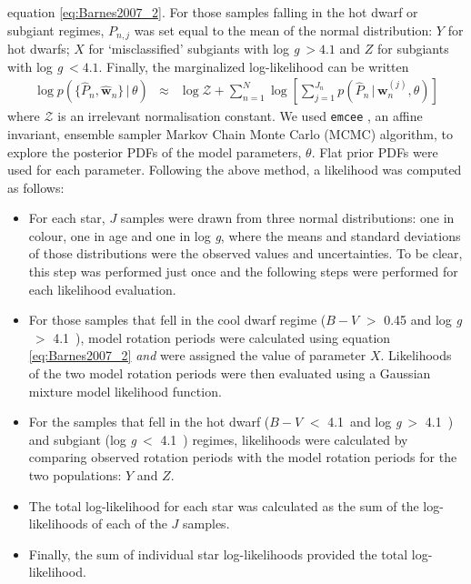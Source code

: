 \documentclass[11pt,preprint]{aastex}
\newcommand{\logg}{log \emph{g}}
\newcommand{\w}{\mathbf{w}}
\newcommand{\subcut}{4.1~}
\begin{document}
equation \ref{eq:Barnes2007_2}.
For those samples falling in the hot dwarf or subgiant regimes, $P_{n,j}$ was
set equal to the mean of the normal distribution: $Y$ for hot dwarfs; $X$ for
`misclassified' subgiants with \logg$~>4.1$ and $Z$ for subgiants with
\logg$~<4.1$.
Finally, the marginalized log-likelihood can be written
\begin{eqnarray}
	\log p(\{\hat{P}_n,\hat{\w}_n\}\,|\,\theta) &\approx&
	\log \mathcal{Z} + \sum_{n=1}^N
	\log \left[ \sum_{j=1}^{J_n}p(\hat{P}_n\,|\,\mathbf{w}_n^{(j)}, \theta) \right ]
\end{eqnarray}
where $\mathcal{Z}$ is an irrelevant normalisation constant.
We used {\tt emcee} \citep{Foreman-Mackey2013}, an affine invariant, ensemble
sampler Markov Chain Monte Carlo (MCMC) algorithm, to explore the posterior
PDFs of the model parameters, $\theta$.
Flat prior PDFs were used for each parameter.
Following the above method, a likelihood was computed as follows:
\begin{itemize}
	\item For each star, $J$ samples were drawn from three normal
		distributions: one in colour, one in age and one in \logg,
		where the means and standard deviations of those distributions
		were the observed values and uncertainties.
		To be clear, this step was performed just once and the
		following steps were performed for each likelihood evaluation.
	\item For those samples that fell in the cool dwarf regime
		($B-V$ $>$ 0.45 and \logg$~>$ \subcut), model rotation
		periods were calculated using equation \ref{eq:Barnes2007_2}
		{\it and} were assigned the value of parameter $X$.
		Likelihoods of the two model rotation periods were then
		evaluated using a Gaussian mixture model
		likelihood function.
	\item For the samples that fell in the hot dwarf ($B-V$ $<$ \subcut and
		\logg$~>$ \subcut) and subgiant (\logg$~<$ \subcut) regimes,
		likelihoods were calculated by comparing observed rotation
		periods with the model rotation periods for the two
		populations: $Y$ and $Z$.
	\item The total log-likelihood for each star was calculated as the
		sum of the log-likelihoods of each of the $J$ samples.
	\item Finally, the sum of individual star log-likelihoods
		provided the total log-likelihood.
\end{itemize}
\end{document}
